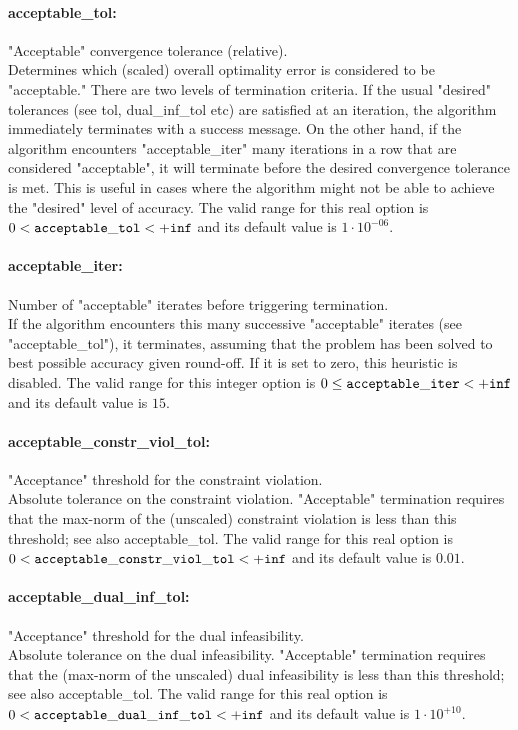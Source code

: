 \paragraph{acceptable\_tol:}\label{opt:acceptable_tol} "Acceptable" convergence tolerance (relative). \\
 Determines which (scaled) overall optimality
error is considered to be "acceptable." There are
two levels of termination criteria.  If the usual
"desired" tolerances (see tol, dual\_inf\_tol
etc) are satisfied at an iteration, the algorithm
immediately terminates with a success message. 
On the other hand, if the algorithm encounters
"acceptable\_iter" many iterations in a row that
are considered "acceptable", it will terminate
before the desired convergence tolerance is met.
This is useful in cases where the algorithm might
not be able to achieve the "desired" level of
accuracy. The valid range for this real option is 
$0 <  {\tt acceptable\_tol } <  {\tt +inf}$
and its default value is $1 \cdot 10^{-06}$.


\paragraph{acceptable\_iter:}\label{opt:acceptable_iter} Number of "acceptable" iterates before triggering termination. \\
 If the algorithm encounters this many successive
"acceptable" iterates (see "acceptable\_tol"), it
terminates, assuming that the problem has been
solved to best possible accuracy given round-off.
 If it is set to zero, this heuristic is disabled. The valid range for this integer option is
$0 \le {\tt acceptable\_iter } <  {\tt +inf}$
and its default value is $15$.


\paragraph{acceptable\_constr\_viol\_tol:}\label{opt:acceptable_constr_viol_tol} "Acceptance" threshold for the constraint violation. \\
 Absolute tolerance on the constraint violation.
"Acceptable" termination requires that the
max-norm of the (unscaled) constraint violation
is less than this threshold; see also
acceptable\_tol. The valid range for this real option is 
$0 <  {\tt acceptable\_constr\_viol\_tol } <  {\tt +inf}$
and its default value is $0.01$.


\paragraph{acceptable\_dual\_inf\_tol:}\label{opt:acceptable_dual_inf_tol} "Acceptance" threshold for the dual infeasibility. \\
 Absolute tolerance on the dual infeasibility.
"Acceptable" termination requires that the
(max-norm of the unscaled) dual infeasibility is
less than this threshold; see also
acceptable\_tol. The valid range for this real option is 
$0 <  {\tt acceptable\_dual\_inf\_tol } <  {\tt +inf}$
and its default value is $1 \cdot 10^{+10}$.


